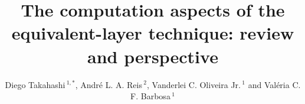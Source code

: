 \documentclass[utf8]{FrontiersinHarvard} %
\def\firstAuthorLast{Takahashi {et~al.}} %
\def\Authors{Diego Takahashi\,$^{1,*}$, André L. A. Reis\,$^{2}$, Vanderlei C. Oliveira Jr.\,$^{1}$ and Valéria C. F. Barbosa\,$^{1}$}
\begin{document}
\onecolumn
{}

\title {The computation aspects of the equivalent-layer technique: review and perspective} 

\author[\firstAuthorLast ]{\Authors} %
\address{} %
\correspondance{} %

\extraAuth{}%


\maketitle
\end{document}
